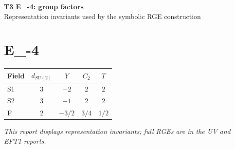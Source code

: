 \documentclass[10pt,a4paper]{article}
\begin{document}
\begin{center}
{\Large\bfseries T3 E\_-4: group factors}\\[4pt]
Representation invariants used by the symbolic RGE construction
\end{center}
\bigskip
\section*{E\_-4}
\begin{longtable}{@{}lcccc@{}}
\toprule Field & $d_{SU(2)}$ & $Y$ & $C_2$ & $T$ \\
\midrule
S1 & 3 & $-2$ & $2$ & $2$ \\
S2 & 3 & $-1$ & $2$ & $2$ \\
F & 2 & $-3/2$ & $3/4$ & $1/2$ \\
\bottomrule
\end{longtable}
\emph{This report displays representation invariants; full RGEs are in the UV and EFT1 reports.}
\end{document}
